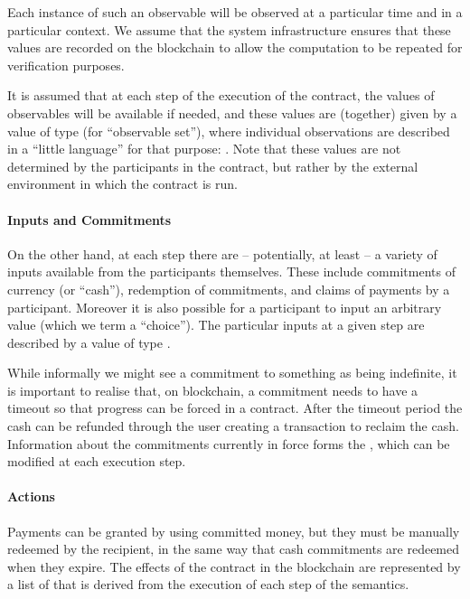 \documentclass[runningheads]{llncs}
\begin{document}
Each instance of such an observable will be observed at a particular time and in a particular context. We assume that 
the system infrastructure ensures that these values are recorded on the blockchain to allow the computation to be 
repeated for verification purposes. 


It is assumed that at each step of the execution of the contract, the values of observables will be available if 
needed, and these values are (together) given by a value of type  (for ``observable set''), where 
individual observations are described in a ``little language'' for that purpose: . 
Note that these values are not determined by the participants in the contract, but rather by the external environment in 
which the contract is run.

 

\paragraph{Inputs and Commitments}


On the other hand, at each step there are -- potentially, at least -- a variety of inputs available from the 
participants themselves. These include commitments of currency (or ``cash''), redemption of commitments, and claims of 
payments by a participant. Moreover it is also possible for a participant to input an arbitrary value (which we term a 
``choice''). The particular inputs at a given step are described by a value of type .



While informally we might see a commitment to something as being indefinite, it is important to realise that, 
on blockchain, a commitment needs to have a timeout so that progress can be forced in a contract. After the timeout 
period the cash can be refunded through the user creating a transaction to reclaim the cash. Information about the 
commitments currently in force forms the , which can be  modified at each execution step. 

\paragraph{Actions}

Payments can be granted by using committed money, but they must be manually redeemed by the recipient, in the 
same way that cash commitments are redeemed when they expire. The effects of the contract in the blockchain are 
represented by a list  of  that is derived from the execution of each step of 
the semantics.
\end{document}
